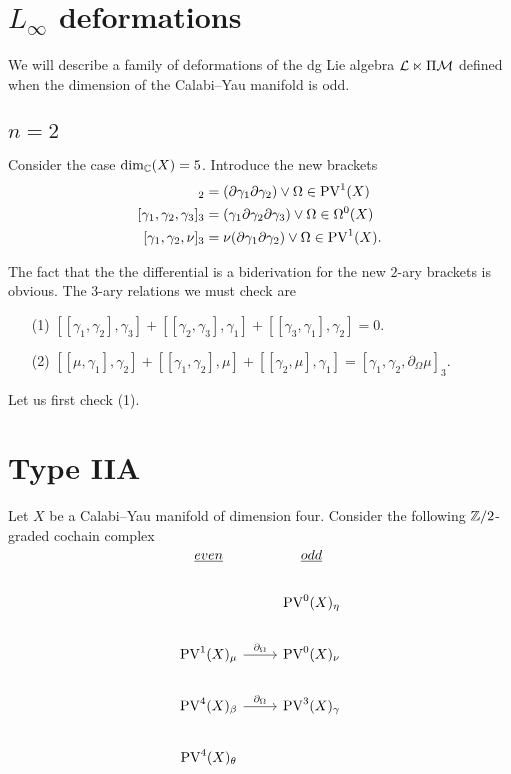 \documentclass[11pt]{amsart}
\def\PV{{\rm PV}}
\begin{document}


\section{$L_\infty$ deformations}
We will describe a family of deformations of the dg Lie algebra $\mathcal L \ltimes \Pi \mathcal M$ defined when the dimension of the Calabi--Yau manifold is odd.

\subsection{$n=2$} 
Consider the case $\dim_{\mathbb C}(X) = 5$. 
Introduce the new brackets
\begin{align*}
[\gamma_1, \gamma_2]_2 &= (\partial \gamma_1 \partial \gamma_2)\vee \Omega \in \PV^1(X) \\
[\gamma_1, \gamma_2, \gamma_3]_3 & = (\gamma_1 \partial \gamma_2 \partial \gamma_3)\vee \Omega \in \Omega^0(X) \\
[\gamma_1, \gamma_2, \nu]_3 & = \nu (\partial \gamma_1 \partial \gamma_2)\vee \Omega \in \PV^1(X) .
\end{align*}

The fact that the the differential is a biderivation for the new $2$-ary brackets is obvious. 
The $3$-ary relations we must check are
\begin{itemize}
\item[(1)] $[[\gamma_1, \gamma_2] , \gamma_3] + [[\gamma_2, \gamma_3], \gamma_1] + [[\gamma_3, \gamma_1], \gamma_2] = 0 .$
\item[(2)] $[[\mu, \gamma_1], \gamma_2] + [[\gamma_1, \gamma_2], \mu] + [[\gamma_2, \mu], \gamma_1] = [\gamma_1, \gamma_2, \partial_\Omega \mu]_3$.
\end{itemize}

Let us first check (1). 

\section{Type IIA}

Let $X$ be a Calabi--Yau manifold of dimension four. 
Consider the following $\mathbb Z/2$-graded cochain complex
\[
\begin{tikzcd}
\ul{even} & \ul{odd} \\
& \PV^0(X)_\eta \\
\PV^1(X)_\mu \ar[r, "\partial_\Omega"] & \PV^0 (X)_\nu \\
\PV^4(X)_\beta \ar[r, "\partial_\Omega"] & \PV^3(X)_\gamma \\
\PV^4(X)_\theta
\end{tikzcd}
\]
\end{document}
